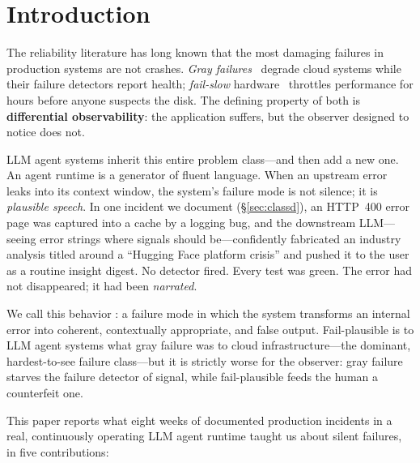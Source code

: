 \section{Introduction}\label{sec:intro}

The reliability literature has long known that the most damaging failures
in production systems are not crashes. \emph{Gray
failures}~\cite{huang2017gray} degrade cloud systems while their failure
detectors report health; \emph{fail-slow} hardware~\cite{gunawi2018failslow}
throttles performance for hours before anyone suspects the disk. The
defining property of both is \textbf{differential observability}: the
application suffers, but the observer designed to notice does not.

LLM agent systems inherit this entire problem class---and then add a new
one. An agent runtime is a generator of fluent language. When an upstream
error leaks into its context window, the system's failure mode is not
silence; it is \emph{plausible speech}. In one incident we document
(\S\ref{sec:classd}), an HTTP~400 error page was captured into a cache by
a logging bug, and the downstream LLM---seeing error strings where
signals should be---confidently fabricated an industry analysis titled
around a ``Hugging Face platform crisis'' and pushed it to the user as a
routine insight digest. No detector fired. Every test was green. The
error had not disappeared; it had been \emph{narrated}.

We call this behavior \failplausible{}: a failure mode in which the
system transforms an internal error into coherent, contextually
appropriate, and false output. Fail-plausible is to LLM agent systems
what gray failure was to cloud infrastructure---the dominant,
hardest-to-see failure class---but it is strictly worse for the observer:
gray failure starves the failure detector of signal, while fail-plausible
feeds the human a counterfeit one.

This paper reports what eight weeks of documented production incidents in
a real, continuously operating LLM agent runtime taught us about silent
failures, in five contributions:

